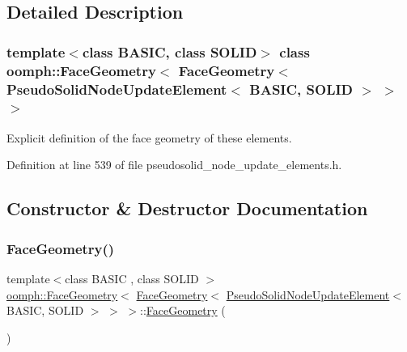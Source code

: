 \subsection{Detailed Description}
\subsubsection*{template$<$class B\+A\+S\+IC, class S\+O\+L\+ID$>$\newline
class oomph\+::\+Face\+Geometry$<$ Face\+Geometry$<$ Pseudo\+Solid\+Node\+Update\+Element$<$ B\+A\+S\+I\+C, S\+O\+L\+I\+D $>$ $>$ $>$}

Explicit definition of the face geometry of these elements. 

Definition at line 539 of file pseudosolid\+\_\+node\+\_\+update\+\_\+elements.\+h.



\subsection{Constructor \& Destructor Documentation}
\mbox{\label{classoomph_1_1FaceGeometry_3_01FaceGeometry_3_01PseudoSolidNodeUpdateElement_3_01BASIC_00_01SOLID_01_4_01_4_01_4_a6c8c9148818426e94b61b0f6d22b4c61}} 
\subsubsection{\texorpdfstring{Face\+Geometry()}{FaceGeometry()}}
{\footnotesize\ttfamily template$<$class B\+A\+S\+IC , class S\+O\+L\+ID $>$ \\
\hyperlink{classoomph_1_1FaceGeometry}{oomph\+::\+Face\+Geometry}$<$ \hyperlink{classoomph_1_1FaceGeometry}{Face\+Geometry}$<$ \hyperlink{classoomph_1_1PseudoSolidNodeUpdateElement}{Pseudo\+Solid\+Node\+Update\+Element}$<$ B\+A\+S\+IC, S\+O\+L\+ID $>$ $>$ $>$\+::\hyperlink{classoomph_1_1FaceGeometry}{Face\+Geometry} (\begin{DoxyParamCaption}{ }\end{DoxyParamCaption})\hspace{0.3cm}{\ttfamily [inline]}}



